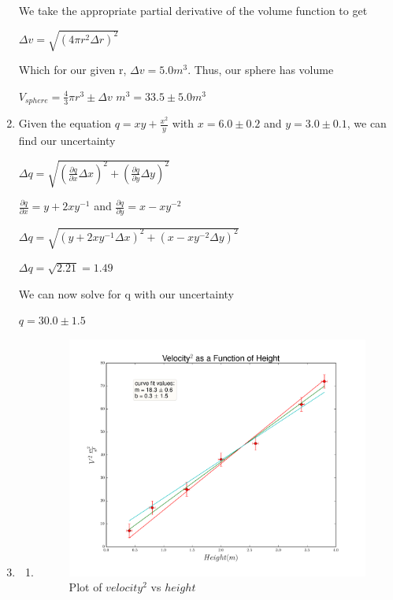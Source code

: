 \documentclass[]{article}
\begin{document}
\begin{enumerate}
We take the appropriate partial derivative of the volume function to get 

\begin{center}
$ \Delta v= \sqrt{(4 \pi r^2 \Delta r)^2}$
\end{center}
Which for our given r, $\Delta v = 5.0 m^3$. Thus, our sphere has volume 
\begin{center}
$ V_{sphere} = \frac{4}{3} \pi r^3 \pm \Delta v$ $ m^3 = 33.5 \pm 5.0 m^3$
\end{center}
\item
Given the equation $q = xy + \frac{x^2}{y}$ with $x = 6.0 \pm 0.2$ and $y = 3.0 \pm 0.1$, we can find our uncertainty 
\begin{center}
$\Delta q = \sqrt{(\frac {\partial q}{\partial x} \Delta x)^2 + (\frac{\partial q}{\partial y} \Delta y)^2}$

$\frac{\partial q}{\partial x} = y + 2xy^{-1}$ and $\frac{\partial q}{\partial y} = x-xy^{-2}$

$\Delta q = \sqrt{(y + 2xy^{-1} \Delta x)^2 + (x-xy^{-2} \Delta y)^2}$

$\Delta q = \sqrt{2.21} = 1.49$
\end{center}

We can now solve for q with our uncertainty
\begin{center}
$q = 30.0 \pm 1.5$
\end{center}

\item
\begin{enumerate}[label=(\alph*)]
\item \begin{figure}
  \includegraphics[width=\linewidth]{a1plot.png}
  \caption{Plot of $velocity^2$ vs $height$}
  \label{fig:Plot}
\end{figure}


\end{enumerate}
\end{enumerate}
\end{document}
